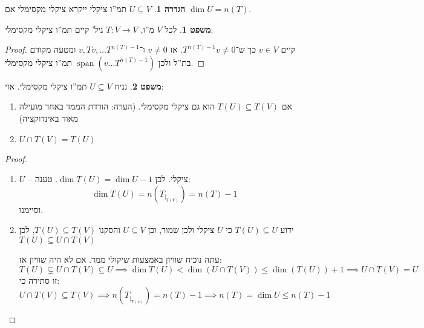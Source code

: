 \documentclass[a4paper]{article}
\DeclareMathOperator{\Sp}      {span}
\newcommand\co        {\colon}
\newcommand\cl [1]    {\left ( #1 \right )}
\theoremstyle{definition}
\newtheorem{Theorem}{משפט}
\newtheorem{definition}{הגדרה}
\newcommand\theo  [1] {\begin{Theorem}#1\end{Theorem}}
\newcommand\defi  [1] {\begin{definition}#1\end{definition}}
\begin{document}
	\defi{$U \subseteq V$ תמ''ו ציקלי ייקרא ציקלי מקסימלי אם $\dim U = n(T)$. }
	\theo{לכל $V$ מ''ו, $T \co V \to V$ ניל' קיים תמ''ו ציקלי מקסימלי. }
	\begin{proof}
		קיים $v \in V$ כך ש־$T^{n(T) - 1}v \neq 0$. אז $v \neq 0$ ו־$v, Tv, \dots T^{n(T) - 1}$ ומטעה מקודם בת''ל ולכן $\Sp(v \dots T^{n(T) -1})$ תמ''ו ציקלי מקסימלי. 
	\end{proof}
	
	
	\theo{נניח $U \subseteq V$ תמ''ו ציקלי מקסימלי. אזי: 
		\begin{enumerate}
			\item אם $T(U) \subseteq T(V)$ הוא גם ציקלי מקסימלי. \textsf{(הערה: הורדת הממד באחד מועילה מאוד באינדוקציה)}
			\item $U \cap T(V) = T(U)$ 
	\end{enumerate}}
	\begin{proof}\,
		\begin{enumerate}
			\item $U$ – ציקלי. לכן $\dim T(U) = \dim U - 1$. 
			טענה: 
			\[ \dim T(U) = n\cl{T_{|_{T(V)}}} = n(T) - 1 \]
			וסיימנו. 
			\item ידוע $T(U) \subseteq U$ כי $U$ ציקלי ולכן שמור, וכן $U \subseteq V$ והסקנו $T(U) \subseteq T(V)$, לכן $T(U) \subseteq U \cap T(V)$
			
			עתה נוכיח שוויון באמצעות שיקולי ממד. אם לא היה שוויון אז: 
			\[ T(U) \subsetneq U \cap T(V) \subseteq U \implies \dim T(U) < \dim (U \cap T(V)) \le \dim (T(U)) + 1 \implies U \cap T(V) = U \]
			זו סתירה כי: 
			\[ U \cap T(V) \subseteq T(V) \implies n(T_{|_{T(v)}}) = n(T) - 1 \implies n(T) = \dim U \le n(T) - 1 \]
			
		\end{enumerate}
	\end{proof}
	
\end{document}
